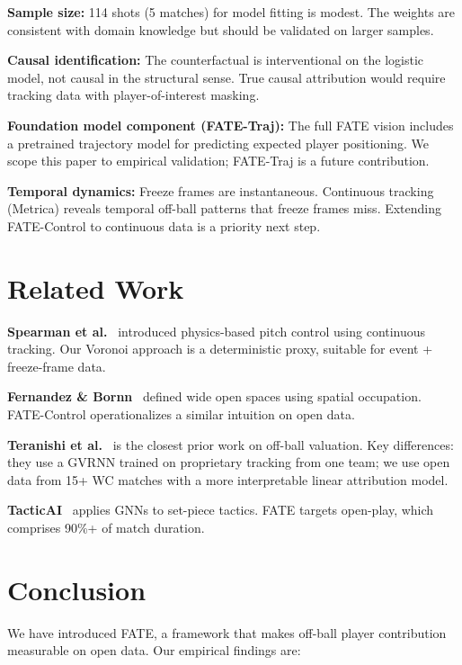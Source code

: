 \documentclass[10pt,twocolumn]{article}
\begin{document}
\textbf{Sample size:} 114 shots (5 matches) for model fitting is modest. The weights are consistent with domain knowledge but should be validated on larger samples.

\textbf{Causal identification:} The counterfactual is interventional on the logistic model, not causal in the structural sense. True causal attribution would require tracking data with player-of-interest masking.

\textbf{Foundation model component (FATE-Traj):} The full FATE vision includes a pretrained trajectory model for predicting expected player positioning. We scope this paper to empirical validation; FATE-Traj is a future contribution.

\textbf{Temporal dynamics:} Freeze frames are instantaneous. Continuous tracking (Metrica) reveals temporal off-ball patterns that freeze frames miss. Extending FATE-Control to continuous data is a priority next step.

\section{Related Work}
\label{sec:related}

\textbf{Spearman et al.}~\citep{spearman2017physics} introduced physics-based pitch control using continuous tracking. Our Voronoi approach is a deterministic proxy, suitable for event + freeze-frame data.

\textbf{Fernandez \& Bornn}~\citep{fernandez2018wide} defined wide open spaces using spatial occupation. FATE-Control operationalizes a similar intuition on open data.

\textbf{Teranishi et al.}~\citep{teranishi2022} is the closest prior work on off-ball valuation. Key differences: they use a GVRNN trained on proprietary tracking from one team; we use open data from 15+ WC matches with a more interpretable linear attribution model.

\textbf{TacticAI}~\citep{wang2023tacticai} applies GNNs to set-piece tactics. FATE targets open-play, which comprises 90\%+ of match duration.

\section{Conclusion}
\label{sec:conclusion}

We have introduced FATE, a framework that makes off-ball player contribution measurable on open data. Our empirical findings are:
\end{document}
